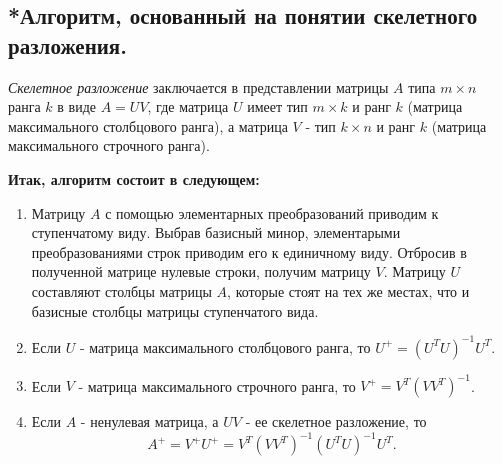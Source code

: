 \subsection{
    *Алгоритм, основанный на понятии скелетного разложения.
}

\textit{Скелетное разложение} заключается в представлении матрицы $A$ типа $m \times n$ ранга $k$ в виде $A = UV$, где матрица $U$ имеет тип $m \times k$ и ранг $k$ (матрица максимального столбцового ранга), а матрица $V$ - тип $k \times n$ и ранг $k$ (матрица максимального строчного ранга).

\textbf{Итак, алгоритм состоит в следующем:}


\begin{enumerate}
    \item Матрицу $A$ с помощью элементарных преобразований приводим к ступенчатому виду. Выбрав базисный минор, элементарыми преобразованиями строк приводим его к единичному виду. Отбросив в полученной матрице нулевые строки, получим матрицу $V$. Матрицу $U$ составляют столбцы матрицы $A$, которые стоят на тех же местах, что и базисные столбцы матрицы ступенчатого вида.
    \item Если $U$ - матрица максимального столбцового ранга, то $U^+ = (U^TU)^{-1}U^T$.
    \item Если $V$ - матрица максимального строчного ранга, то $V^+ = V^T(VV^T)^{-1}$.
    \item Если $A$ - ненулевая матрица, а $UV$ - ее скелетное разложение, то
    $$A^+ = V^+U^+ = V^T(VV^T)^{-1}(U^TU)^{-1}U^T.$$
\end{enumerate}

